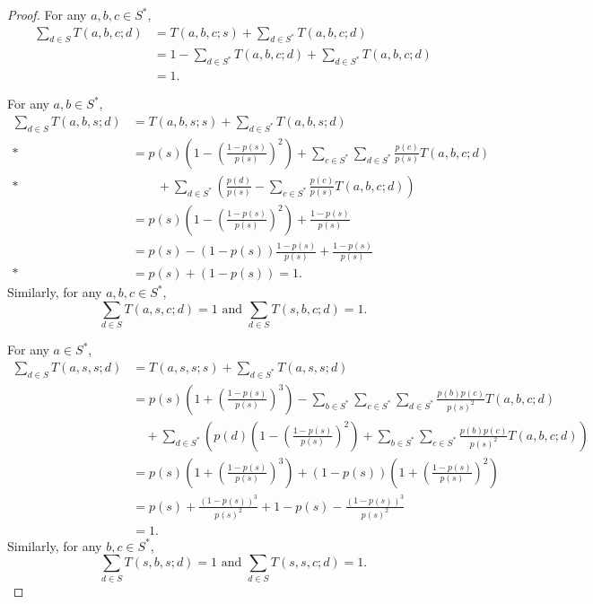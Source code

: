 \documentclass[10pt]{amsart}
\theoremstyle{definition}\newtheorem{defi}[theo]{Definition}\newtheorem{rema}[theo]{Remark}\newtheorem{exam}[theo]{Example}\newtheorem{exem}[theo]{Example}\newtheorem{nota}[theo]{Notation}
\newcounter{a}
\begin{document}
\begin{proof}
For any $a,b,c \in S^*$,
\begin{align*}
\sum_{d \in S} T(a,b,c;d) & = T(a,b,c;s) + \sum_{d \in S^*} T(a,b,c;d) \\
& = 1 - \sum_{d \in S^*} T(a,b,c;d) + \sum_{d \in S^*} T(a,b,c;d) \\
& = 1.
\end{align*}

For any $a,b \in S^*$,
\begingroup
\allowdisplaybreaks
\begin{align*}
\sum_{d \in S} T(a,b,s;d) & = T(a,b,s;s) + \sum_{d \in S^*} T(a,b,s;d) \\*
& = p(s) \left(1 - \left(\frac{1-p(s)}{p(s)} \right)^2 \right) + \sum_{c \in S^*} \sum_{d \in S^*} \frac{p(c)}{p(s)}T(a,b,c;d) \\*
&\qquad+ \sum_{d \in S^*} \left(\frac{p(d)}{p(s)} - \sum_{c \in S^*} \frac{p(c)}{p(s)} T(a,b,c;d)\right) \\
& = p(s) \left(1 - \left(\frac{1-p(s)}{p(s)} \right)^2 \right) + \frac{1-p(s)}{p(s)} \\
& = p(s) - (1-p(s)) \frac{1-p(s)}{p(s)} + \frac{1-p(s)}{p(s)} \\*
& = p(s) + (1 - p(s)) =1.
\end{align*}
\endgroup
Similarly, for any $a,b,c \in S^*$,
\[
\sum_{d\in S} T(a,s,c;d) =1 \text{ and } \sum_{d\in S} T(s,b,c;d) =1.
\]

For any $a \in S^*$,
\begin{align*}
\sum_{d \in S} T(a,s,s;d) & = T(a,s,s;s) + \sum_{d \in S^*} T(a,s,s;d) \\
& = p(s) \left(1 + \left(\frac{1-p(s)}{p(s)} \right)^3 \right) - \sum_{b \in S^*} \sum_{c \in S^*} \sum_{d \in S^*} \frac{p(b)p(c)}{p(s)^2}T(a,b,c;d) \\
&\quad+ \sum_{d \in S^*} \left(p(d) \left(1 - \left(\frac{1-p(s)}{p(s)} \right)^2 \right) + \sum_{b \in S^*} \sum_{c \in S^*} \frac{p(b)p(c)}{p(s)^2}T(a,b,c;d) \right)\\
& = p(s) \left(1 + \left(\frac{1-p(s)}{p(s)} \right)^3 \right)+ (1-p(s)) \left(1 + \left(\frac{1-p(s)}{p(s)} \right)^2 \right) \\
& = p(s) + \frac{(1-p(s))^3}{p(s)^2} + 1 - p(s) - \frac{(1-p(s))^3}{p(s)^2}\\
& = 1.
\end{align*}
Similarly, for any $b,c \in S^*$,
\[
\sum_{d\in S} T(s,b,s;d) =1 \text{ and } \sum_{d\in S} T(s,s,c;d) =1.
\]


\end{proof}
\end{document}

